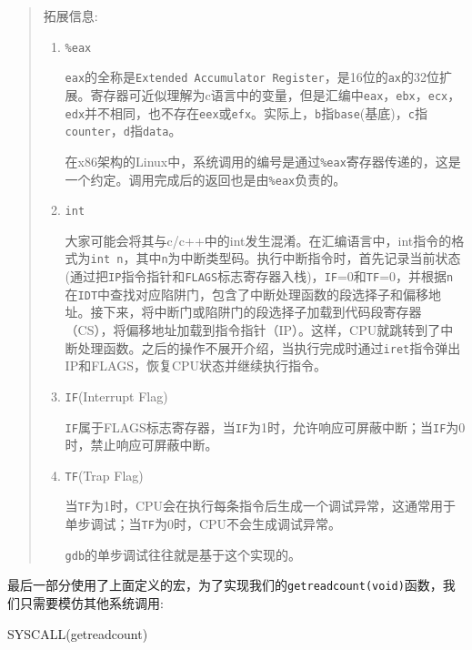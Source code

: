 \documentclass[
]{article}
\newenvironment{Shaded}{}{}
\newcommand{\NormalTok}[1]{#1}
\newcommand{\OperatorTok}[1]{\textcolor[rgb]{0.40,0.40,0.40}{#1}}
\begin{document}
\begin{quote}
	拓展信息:

	\begin{enumerate}
		\def\labelenumi{\arabic{enumi}.}
		\item
		      \texttt{\%eax}

		      \texttt{eax}的全称是\texttt{Extended\ Accumulator\ Register}，是16位的\texttt{ax}的32位扩展。寄存器可近似理解为c语言中的变量，但是汇编中\texttt{eax}，\texttt{ebx}，\texttt{ecx}，\texttt{edx}并不相同，也不存在\texttt{eex}或\texttt{efx}。实际上，\texttt{b}指\texttt{base}(基底)，\texttt{c}指\texttt{counter}，\texttt{d}指\texttt{data}。

		      在x86架构的Linux中，系统调用的编号是通过\texttt{\%eax}寄存器传递的，这是一个约定。调用完成后的返回也是由\texttt{\%eax}负责的。
		\item
		      \texttt{int}

		      大家可能会将其与c/c++中的int发生混淆。在汇编语言中，int指令的格式为\texttt{int\ n}，其中\texttt{n}为中断类型码。执行中断指令时，首先记录当前状态(通过把\texttt{IP}指令指针和\texttt{FLAGS}标志寄存器入栈)，\texttt{IF}=0和\texttt{TF}=0，并根据\texttt{n}在\texttt{IDT}中查找对应陷阱门，包含了中断处理函数的段选择子和偏移地址。接下来，将中断门或陷阱门的段选择子加载到代码段寄存器（CS），将偏移地址加载到指令指针（IP）。这样，CPU就跳转到了中断处理函数。之后的操作不展开介绍，当执行完成时通过\texttt{iret}指令弹出IP和FLAGS，恢复CPU状态并继续执行指令。
		\item
		      \texttt{IF}(Interrupt Flag)

		      \texttt{IF}属于FLAGS标志寄存器，当\texttt{IF}为1时，允许响应可屏蔽中断；当\texttt{IF}为0时，禁止响应可屏蔽中断。
		\item
		      \texttt{TF}(Trap Flag)

		      当\texttt{TF}为1时，CPU会在执行每条指令后生成一个调试异常，这通常用于单步调试；当\texttt{TF}为0时，CPU不会生成调试异常。

		      \texttt{gdb}的单步调试往往就是基于这个实现的。
	\end{enumerate}
\end{quote}

最后一部分使用了上面定义的宏，为了实现我们的\texttt{getreadcount(void)}函数，我们只需要模仿其他系统调用:

\begin{Shaded}
	\begin{Highlighting}[]
		\NormalTok{SYSCALL}\OperatorTok{(}\NormalTok{getreadcount}\OperatorTok{)}
	\end{Highlighting}
\end{Shaded}
\end{document}

